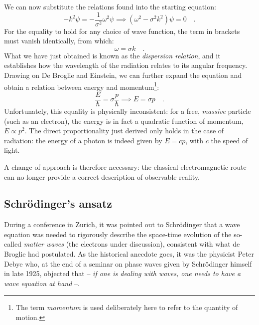 We can now substitute the relations found into the starting equation:
\[
            -k^2\psi = -\frac{1}{\sigma^2} \omega^2 \psi \implies (\omega^2-\sigma^2 k^2)\psi = 0\quad.
\]
For the equality to hold for any choice of wave function, the term in brackets must vanish identically, from which:
\[
    \omega = \sigma k \quad.
\]
What we have just obtained is known as the \emph{dispersion relation}, and it establishes how the wavelength of the radiation relates to its angular frequency. Drawing on De Broglie and Einstein, we can further expand the equation and obtain a relation between energy and momentum\footnote{The term \emph{momentum} is used deliberately here to refer to the quantity of motion.}:
\[
    \frac{E}{\hbar} = {\sigma} \frac{p}{\hbar} \implies
    E = {\sigma} p
    \quad .
\]
Unfortunately, this equality is physically inconsistent: for a free, \emph{massive} particle (such as an electron), the energy is in fact a quadratic function of momentum, $E \propto p^2$. The direct proportionality just derived only holds in the case of radiation: the energy of a photon is indeed given by $E = cp$, with $c$ the speed of light.

A change of approach is therefore necessary: the classical-electromagnetic route can no longer provide a correct description of observable reality.

\subsection{Schrödinger's ansatz}
During a conference in Zurich, it was pointed out to Schrödinger that a wave equation was needed to rigorously describe the space-time evolution of the so-called \emph{matter waves} (the electrons under discussion), consistent with what de Broglie had postulated. As the historical anecdote goes, it was the physicist Peter Debye who, at the end of a seminar on phase waves given by Schrödinger himself in late 1925, objected that -- \emph{if one is dealing with waves, one needs to have a wave equation at hand} --.

